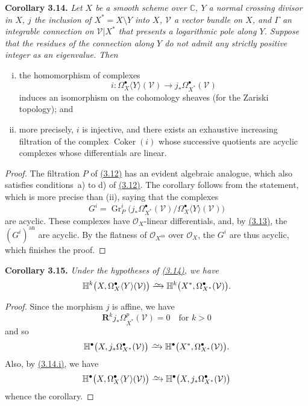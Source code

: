 \documentclass{report}
\newenvironment{itenv}[1]
  {\phantomsection\par\medskip\noindent\textbf{#1.}\itshape}
  {\medskip}
\renewcommand{\cal}[1]{{\mathcal{#1}}}
\newcommand{\CC}{\mathbb{C}}
\newcommand{\RR}{\mathbf{R}}
\newcommand{\an}{\mathrm{an}}
\newcommand{\simto}{\xrightarrow{\raisebox{-0.7ex}[0ex][0ex]{$\sim$}}}
\DeclareMathOperator{\Coker}{Coker}
\DeclareMathOperator{\Gr}{Gr}
\newcommand{\oldpage}[1]{\marginpar{\footnotesize$\Big\vert$ \textit{p.~#1}}}
\begin{document}
\begin{itenv}{Corollary 3.14}
\label{II.3.14}
  Let $X$ be a smooth scheme over $\CC$, $Y$ a normal crossing divisor in $X$, $j$ the inclusion of $X^*=X\setminus Y$ into $X$, $\cal{V}$ a vector bundle on $X$, and $\Gamma$ an integrable connection on $\cal{V}|X^*$ that presents a logarithmic pole along $Y$.
  Suppose that the residues of the connection along $Y$ do not admit any strictly positive integer as an eigenvalue.
  Then
  \begin{enumerate}[(i)]
    \item the homomorphism of complexes
      \[
        i\colon \Omega_X^\bullet\langle Y\rangle(\cal{V}) \to j_*\Omega_{X^*}^\bullet(\cal{V})
      \]
      induces an isomorphism on the cohomology sheaves (for the Zariski topology); and
    \item more precisely, $i$ is injective, and there exists an exhaustive increasing filtration of the complex $\Coker(i)$ whose successive quotients are acyclic complexes whose differentials are linear.
  \end{enumerate}
\end{itenv}

\begin{proof}
  The filtration $P$ of \hyperref[II.3.12]{(3.12)} has an evident algebraic analogue, which also satisfies conditions~a) to d) of \hyperref[II.3.12]{(3.12)}.
  The corollary follows from the statement, which is more precise than (ii), saying that the complexes
  \[
    G^i = \Gr^i_P\big(j_*\Omega_{X^*}^\bullet(\cal{V})\big/\Omega_X^\bullet\langle Y\rangle(\cal{V})\big)
  \]
  are acyclic.
  These complexes have $\cal{O}_X$-linear differentials, and, by \hyperref[II.3.13]{(3.13)},
\oldpage{85}
  the $(G^i)^\an$ are acyclic.
  By the flatness of $\cal{O}_{X^\an}$ over $\cal{O}_X$, the $G^i$ are thus acyclic, which finishes the proof.
\end{proof}

\begin{itenv}{Corollary 3.15}
\label{II.3.15}
  Under the hypotheses of \hyperref[II.3.14]{(3.14)}, we have
  \[
    \mathbb{H}^k\big(X,\Omega_X^\bullet\langle Y\rangle(\cal{V})\big)
    \simto \mathbb{H}^k\big(X^*,\Omega_{X^*}^\bullet(\cal{V})\big).
  \]
\end{itenv}

\begin{proof}
  Since the morphism $j$ is affine, we have
  \[
    \RR^kj_*\Omega_{X^*}^p(\cal{V})=0
    \quad\mbox{for $k>0$}
  \]
  and so
  \[
    \mathbb{H}^\bullet\big(X,j_*\Omega_{X^*}^\bullet(\cal{V})\big)
    \simto \mathbb{H}^\bullet\big(X^*,\Omega_{X^*}^\bullet(\cal{V})\big).
  \]
  Also, by \hyperref[II.3.14]{(3.14.i)}, we have
  \[
    \mathbb{H}^\bullet\big(X,\Omega_X^\bullet\langle Y\rangle(\cal{V})\big)
    \simto \mathbb{H}^\bullet\big(X,j_*\Omega_{X^*}^\bullet(\cal{V})\big)
  \]
  whence the corollary.
\end{proof}
\end{document}

